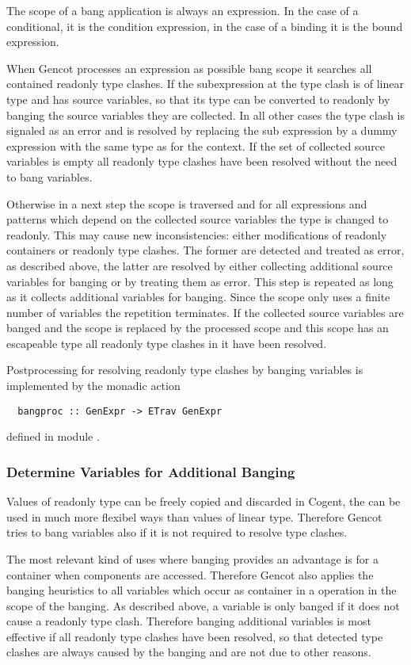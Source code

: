 The scope of a bang application is always an expression. In the case of a conditional, it is the condition expression, in the
case of a binding it is the bound expression.

When Gencot processes an expression as possible bang scope it searches all
contained readonly type clashes. If the subexpression at the type clash is of linear type and has source variables, so that
its type can be converted to readonly by banging the source variables they are collected. In all other cases the type clash
is signaled as an error and is resolved by replacing the sub expression by a dummy expression with the same type as for the
context. If the set of collected source variables is empty all readonly type clashes have been resolved without the need to
bang variables.

Otherwise in a next step the scope is traversed and for all expressions and patterns which depend on the collected source
variables the type is changed to readonly. This may cause new inconsistencies: either modifications of readonly containers
or readonly type clashes. The former are detected and treated as error, as described above, the latter are resolved by either
collecting additional source variables for banging or by treating them as error. This step is repeated as long as it collects
additional variables for banging. Since the scope only uses a finite number of variables the repetition terminates. If the
collected source variables are banged and the scope is replaced by the processed scope and this scope has an escapeable type
all readonly type clashes in it have been resolved.

Postprocessing for resolving readonly type clashes by banging variables is implemented by the monadic action
\begin{verbatim}
  bangproc :: GenExpr -> ETrav GenExpr
\end{verbatim}
defined in module .

\subsubsection{Determine Variables for Additional Banging}

Values of readonly type can be freely copied and discarded in Cogent, the can be used in much more flexibel ways than
values of linear type. Therefore Gencot tries to bang variables also if it is not required to resolve type clashes.

The most relevant kind of uses where banging provides an advantage is for a container when components are accessed.
Therefore Gencot also applies the banging heuristics to all variables which occur as container in a 
operation in the scope of the banging. As described above, a variable is only banged if it does not cause a readonly type
clash. Therefore banging additional variables is most effective if all readonly type clashes have been resolved, so
that detected type clashes are always caused by the banging and are not due to other reasons.

